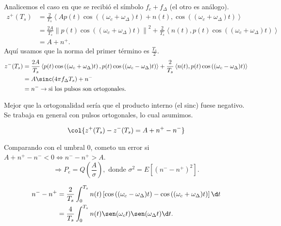 Analicemos el caso en que se recibió el símbolo $f_c+f_\Delta$ (el
otro es análogo).
    \begin{align*}
        z^+(T_s) &= \frac{2}{T_s} \left<A p(t) \cos\left((\omega_c+\omega_\Delta)t\right)+n(t),\cos\left((\omega_c+\omega_\Delta)t\right)\right>\\
        &= \frac{2A}{T_s} \left\|p(t)\cos\left((\omega_c+\omega_\Delta)t\right)\right\|^2 +
        \frac{2}{T_s}\left<n(t),p(t)\cos\left((\omega_c+\omega_\Delta)t\right)\right>\\
        & =A+n^+.
     \end{align*}
Aquí usamos que la norma del primer término es $\frac{T_s}{2}$.
    \begin{align*}
        z^-(T_s) &= \frac{2A}{T_s}\left<p(t)\cos\left((\omega_c+\omega_\Delta)t\right),p(t)\cos\left((\omega_c-\omega_\Delta)t\right)\right>  + \frac{2}{T_s}\left<n(t),p(t)\cos\left((\omega_c-\omega_\Delta)t\right)\right>\\
        &= A\sinc(4\pi f_\Delta T_s) + n^-\\
        &= n^- \rightarrow \text{si los pulsos son ortogonales.}
    \end{align*}
   \begin{remarkSN}
    Mejor que la ortogonalidad sería que el producto interno (el
    sinc) fuese negativo.  Se trabaja en general con pulsos ortogonales, lo cual
    asumimos.\vspace{-0.5cm}
    \end{remarkSN}
    \[\col{z^+(T_s)-z^-(T_s) = A + n^+ - n^-}\]

    Comparando con el umbral $0$, cometo un error si  $A + n^+ - n^- < 0  \Leftrightarrow n^- -
    n^+ > A$.
    \[\Rightarrow P_e = Q\left(\frac{A}{\sigma}\right), \text{ donde } \sigma^2 = E\left[(n^- - n^+)^2\right].\]

    \begin{align*}
        n^- - n^+ &= \frac{2}{T_s} \int_0^{T_s} n(t)\left[\cos\left((\omega_c - \omega_\Delta)t\right) - \cos\left((\omega_c + \omega_\Delta)t\right)\right]\d t\\
        &= \frac{4}{T_s} \int_0^{T_s} n(t)\sen(\omega_c t)\sen(\omega_\Delta t)\d
        t.
    \end{align*}


